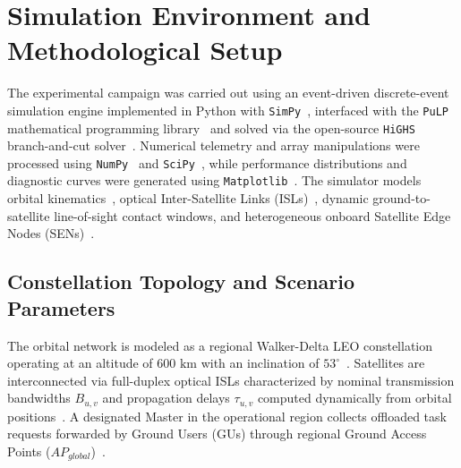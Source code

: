 \section{Simulation Environment and Methodological Setup}
\label{sec:exp_setup}

The experimental campaign was carried out using an event-driven discrete-event simulation engine implemented in Python with \texttt{SimPy}~\cite{simpy2023}, interfaced with the \texttt{PuLP} mathematical programming library~\cite{pulp2011} and solved via the open-source \texttt{HiGHS} branch-and-cut solver~\cite{huangfu2018highs}. Numerical telemetry and array manipulations were processed using \texttt{NumPy}~\cite{harris2020numpy} and \texttt{SciPy}~\cite{virtanen2020scipy}, while performance distributions and diagnostic curves were generated using \texttt{Matplotlib}~\cite{hunter2007matplotlib}. The simulator models orbital kinematics~\cite{vallado2006sgp4}, optical Inter-Satellite Links (ISLs)~\cite{chen2021isl, chaudhry2021laser}, dynamic ground-to-satellite line-of-sight contact windows, and heterogeneous onboard Satellite Edge Nodes (SENs)~\cite{icdcs_satellite_2025}.

\subsection{Constellation Topology and Scenario Parameters}
\label{subsec:topology_params}

The orbital network is modeled as a regional Walker-Delta LEO constellation operating at an altitude of $600\text{ km}$ with an inclination of $53^\circ$~\cite{walker1984satellite}. Satellites are interconnected via full-duplex optical ISLs characterized by nominal transmission bandwidths $B_{u,v}$ and propagation delays $\tau_{u,v}$ computed dynamically from orbital positions~\cite{chaudhry2021laser}. A designated Master in the operational region collects offloaded task requests forwarded by Ground Users (GUs) through regional Ground Access Points ($AP_{global}$)~\cite{icdcs_satellite_2025}.

